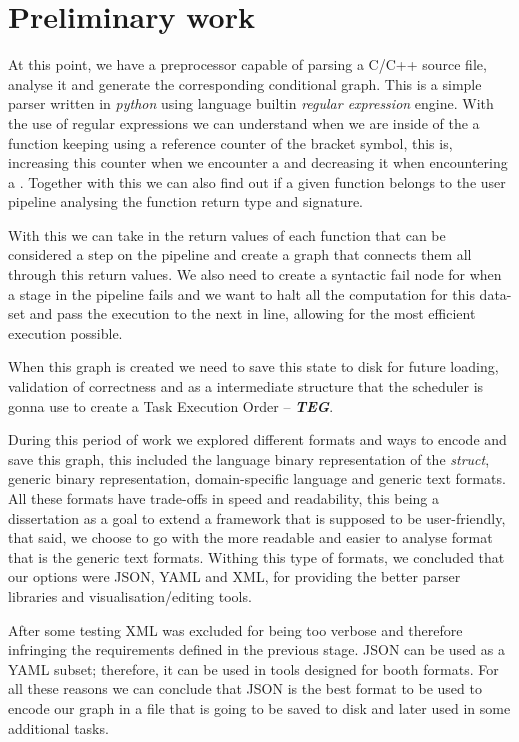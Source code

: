 \chapter{Preliminary work}
\par At this point, we have a preprocessor capable of parsing a C/C++ source file, analyse it and generate the corresponding conditional graph. 
This is a simple parser written in \textit{python} using language builtin \textit{regular expression} engine. With the use of regular expressions we can understand when we are inside of the a function keeping using a reference counter of the bracket symbol, this is, increasing this counter when we encounter a { and decreasing it when encountering a }. Together with this we can also find out if a given function belongs to the user pipeline analysing the function return type and signature.

With this we can take in the return values of each function that can be considered a step on the pipeline and create a graph that connects them all through this return values. We also need to create a syntactic fail node for when a stage in the pipeline fails and we want to halt all the computation for this data-set and pass the execution to the next in line, allowing for the most efficient execution possible.

When this graph is created we need to save this state to disk for future loading, validation of correctness and as a intermediate structure that the scheduler is gonna use to create a Task Execution Order -- \textbf{\textit{TEG}}. 

During this period of work we explored different formats and ways to encode and save this graph, this included the language binary representation of the \textit{struct}, generic binary representation, domain-specific language and generic text formats. All these formats have trade-offs in speed and readability, this being a dissertation as a goal to extend a framework that is supposed to be user-friendly, that said, we choose to go with the more readable and easier to analyse format that is the generic text formats. Withing this type of formats, we concluded that our options were JSON, YAML and XML, for providing the better parser libraries and visualisation/editing tools. 

After some testing XML was excluded for being too verbose and therefore infringing the requirements defined in the previous stage. JSON can be used as a YAML subset; therefore, it can be used in tools designed for booth formats. For all these reasons we can conclude that JSON is the best format to be used to encode our graph in a file that is going to be saved to disk and later used in some additional tasks.

